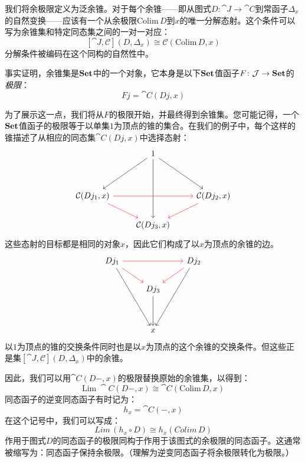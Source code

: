 \documentclass[DaoFP]{subfiles}
\begin{document}
    我们将余极限定义为泛余锥。对于每个余锥——即从图式$D \colon \cat J \to \cat C$到常函子$\Delta_x$的自然变换——应该有一个从余极限$\text{Colim}\, D$到$x$的唯一分解态射。这个条件可以写为余锥集和特定同态集之间的一对一对应：
    \[ [\cat J, \mathcal{C}](D, \Delta_x)  \cong \mathcal{C}( \text{Colim} \, D, x) \]
    分解条件被编码在这个同构的自然性中。

    事实证明，余锥集是$\mathbf{Set}$中的一个对象，它本身是以下$\mathbf{Set}$值函子$F \colon \mathcal{J} \to \mathbf{Set}$的\emph{极限}：
    \[ F j = \cat C(D j, x) \]

    为了展示这一点，我们将从$F$的极限开始，并最终得到余锥集。您可能记得，一个$\mathbf{Set}$值函子的极限等于以单集$1$为顶点的锥的集合。在我们的例子中，每个这样的锥描述了从相应的同态集$\cat C(D j, x)$中选择态射：
    \[
        \begin{tikzcd}
            & 1
            \arrow[ddr, ""]
            \arrow[ddl, ""']
            \arrow[ddd, ""]
            \\
            \\
            \cat C( D j_1, x)
            \arrow[rr, red]
            \arrow[rd, red]
            && \cat C( D j_2, x)
            \arrow[dl, red]
            \\
            & \cat C( D j_3, x)
        \end{tikzcd}
    \]
    这些态射的目标都是相同的对象$x$，因此它们构成了以$x$为顶点的余锥的边。
    \[
        \begin{tikzcd}
            D j_1
            \arrow[rr, red]
            \arrow[dr, red]
            \arrow[dddr, ""']
            && D j_2
            \arrow[dl, red]
            \arrow[dddl, ""]
            \\
            & D j_3
            \arrow[dd, ""]
            \\
            \\
            & x
        \end{tikzcd}
    \]
    以$1$为顶点的锥的交换条件同时也是以$x$为顶点的这个余锥的交换条件。但这些正是集$[\cat J, \mathcal{C}](D, \Delta_x)$中的余锥。

    因此，我们可以用$\cat C(D-, x)$的极限替换原始的余锥集，以得到：
    \[ \text{Lim}\; \cat C (D-, x) \cong \cat C( \text{Colim}\,  D, x) \]
    同态函子的逆变同态函子有时记为：
    \[ h_x = \cat C(-, x) \]
    在这个记号中，我们可以写成：
    \[ Lim \, (h_x \circ D) \cong h_x (Colim \, D) \]
    作用于图式$D$的同态函子的极限同构于作用于该图式的余极限的同态函子。这通常被缩写为：同态函子保持余极限。（理解为逆变同态函子将余极限转化为极限。）
\end{document}
